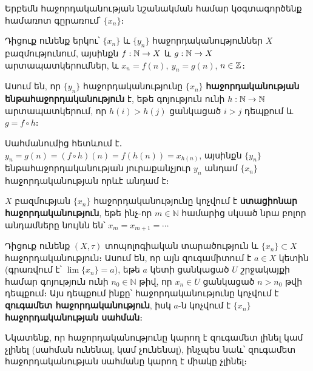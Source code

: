 \documentclass[./main.tex]{subfiles}
\begin{document}
\par Երբեմն հաջորդականության նշանակման համար կօգտագործենք համառոտ գը\-րառում՝ $\{x_n\}$։
\par Դիցուք ունենք երկու՝ $\{x_n\}$ և $\{y_n\}$ հաջորդականություններ $X$ բազմությունում, այսինքն ${f:\mathbb{N}\to X}$ և ${g:\mathbb{N}\to X}$ արտապատկերումներ, և ${x_n=f(n)},\ {y_n=g(n)}$, $n\in \mathbb{Z}$։ 

\begin{definition}
Ասում են, որ $\{y_n\}$ հաջորդականությունը $\{x_n\}$ \textbf{հաջորդականու\-թ\-յան ենթահաջորդականություն} է, եթե գոյություն ունի $h:\mathbb{N}\rightarrow \mathbb{N}$ արտապատ\-կե\-րում, որ $h(i)>h(j)$ ցանկացած $i>j$ դեպքում և $g=f\circ h$։
\end{definition}

Սահմանումից հետևում է․ $y_n=g(n)=(f\circ h)(n)=f(h(n))=x_{h(n)}$, այսինքն $\{y_n\}$ ենթահաջորդականության յուրաքանչյուր $y_n$ անդամ $\{x_n\}$ հաջորդականության որևէ անդամ է։
\begin{definition}
$X$ բազմության $\{x_n\}$ հաջորդականությունը կոչվում է \textbf{ստացիոնար հաջորդականություն}, եթե ինչ-որ $m \in \mathbb{N}$ համարից սկսած նրա բոլոր անդամները նույնն են՝ $x_m = x_{m+1} = \cdots$
\end{definition}

\begin{definition}
Դիցուք ունենք $(X,\tau)$ տոպոլոգիական տարածություն և $\{x_n\} \subset X$ հաջորդականություն։ Ասում են, որ այն զուգամիտում է $a \in X$ կետին (գրառվում է՝ $\lim⁡\{x_n\}=a$), եթե $a$ կետի ցանկացած $U$ շրջակայքի համար գոյություն ունի $n_0 \in \mathbb{N}$ թիվ, որ $x_n \in U$ ցանկացած $n>n_0$ թվի դեպքում։ Այս դեպքում ինքը՝ հաջորդականությունը կոչվում է \textbf{զուգամետ հաջորդականություն}, իսկ $a$-ն կոչվում է $\{x_n\}$ \textbf{հաջորդականության սահման}։
\end{definition}

\par Նկատենք, որ հաջորդականությունը կարող է զուգամետ լինել կամ չլինել (սահ\-ման ունենալ, կամ չունենալ), ինչպես նաև՝ զուգամետ հաջորդականության սահ\-մա\-նը կարող է միակը չլինել։
\end{document}
